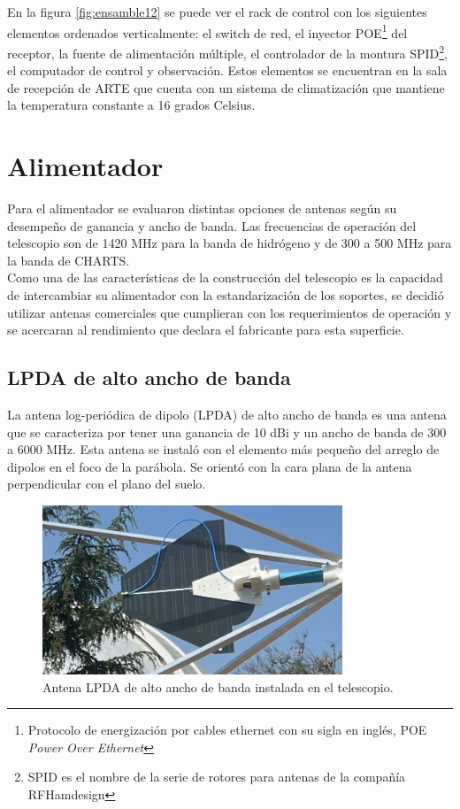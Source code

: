 En la figura \ref{fig:ensamble12} se puede ver el rack de control con los siguientes elementos ordenados verticalmente: el switch de red, el inyector POE\footnote{Protocolo de energización por cables ethernet con su sigla en inglés, POE \textit{Power Over Ethernet}} del receptor, la fuente de alimentación múltiple, el controlador de la montura SPID\footnote{SPID es el nombre de la serie de rotores para antenas de la compañía RFHamdesign}, el computador de control y observación. Estos elementos se encuentran en la sala de recepción de ARTE que cuenta con un sistema de climatización que mantiene la temperatura constante a 16 grados Celsius.\\

\section{Alimentador}

Para el alimentador se evaluaron distintas opciones de antenas según su desempeño de ganancia y ancho de banda. Las frecuencias de operación del telescopio son de 1420 MHz para la banda de hidrógeno y de 300 a 500 MHz para la banda de CHARTS.\\

Como una de las características de la construcción del telescopio es la capacidad de intercambiar su alimentador con la estandarización de los soportes, se decidió utilizar antenas comerciales que cumplieran con los requerimientos de operación y se acercaran al rendimiento que declara el fabricante para esta superficie.\\

\subsection{LPDA de alto ancho de banda}

La antena log-periódica de dipolo (LPDA) de alto ancho de banda es una antena que se caracteriza por tener una ganancia de 10 dBi y un ancho de banda de 300 a 6000 MHz. Esta antena se instaló con el elemento más pequeño del arreglo de dipolos en el foco de la parábola. Se orientó con la cara plana de la antena perpendicular con el plano del suelo.\\ 

\begin{figure}
    \centering
    \includegraphics[width=0.8\textwidth]{img/lpda}
    \caption{Antena LPDA de alto ancho de banda instalada en el telescopio.}
    \label{fig:ensamble13}
\end{figure}

